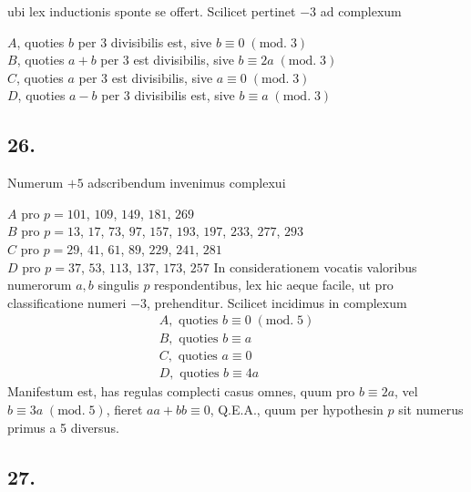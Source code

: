 \documentclass[twoside,12pt, showframe]{memoir}
\renewenvironment{quote}%
  {\list{}{\leftmargin=5em\rightmargin=0em}\item[]}%
  {\endlist}
\renewcommand{\pmod}[1]{\;(\textrm{mod.}\;#1)}
\begin{document}
ubi lex inductionis sponte se offert. Scilicet pertinet \(-3\) ad complexum
\begin{quote}\(A\), quoties \(b\) per 3 divisibilis est, sive \(b \equiv 0\pmod{3}\)\\
\(B\), quoties \(a+b\) per 3 est divisibilis, sive \(b \equiv 2 a\pmod{3}\)\\
\(C\), quoties \(a\) per 3 est divisibilis, sive \(a \equiv 0\pmod{3}\)\\
\(D\), quoties \(a-b\) per 3 divisibilis est, sive \(b \equiv a\pmod{3}\)\end{quote}

\subsection*{26.}
 
Numerum \(+5\) adscribendum invenimus complexui
\begin{quote}
\(A\) pro \(p=101\), \(109\), \(149\), \(181\), \(269\) \\
\(B\) pro \(p=13\), \(17\), \(73\), \(97\), \(157\), \(193\), \(197\), \(233\), \(277\), \(293\) \\
\(C\) pro \(p=29\), \(41\), \(61\), \(89\), \(229\), \(241\), \(281\) \\
\(D\) pro \(p=37\), \(53\), \(113\), \(137\), \(173\), \(257\)\end{quote}
In considerationem vocatis valoribus numerorum \(a, b\) singulis \(p\) respondentibus, lex hic aeque facile, ut pro classificatione numeri \(-3\), prehenditur. Scilicet incidimus in complexum\clearpage\noindent%
\[\begin{array}{l}
A, \text{ quoties } b \equiv 0\pmod{5} \\
B, \text{ quoties } b \equiv a \\
C, \text{ quoties } a \equiv 0 \\
D, \text{ quoties } b \equiv 4 a
\end{array}\]
Manifestum est, has regulas complecti casus omnes, quum pro \(b \equiv 2 a\), vel \(b \equiv 3 a\pmod{5}\), fieret \(a a+b b \equiv 0\), Q.E.A., quum per hypothesin \(p\) sit numerus primus a 5 diversus.

\subsection*{27.}
 
\end{document}
